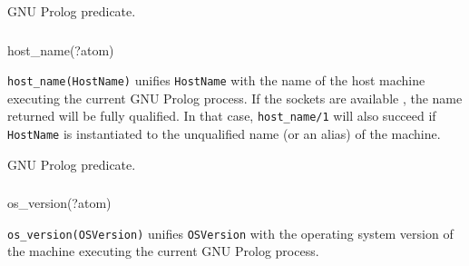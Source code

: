 \Portability

GNU Prolog predicate.

\subsubsection{}

\begin{TemplatesOneCol}
host\_name(?atom)

\end{TemplatesOneCol}

\Description

\texttt{host\_name(HostName)} unifies \texttt{HostName} with the name of the
host machine executing the current GNU Prolog process. If the sockets are
available , the name returned
will be fully qualified. In that case, \texttt{host\_name/1} will also
succeed if \texttt{HostName} is instantiated to the unqualified name (or an
alias) of the machine.

\begin{PlErrors}



\end{PlErrors}

\Portability

GNU Prolog predicate.

\subsubsection{}

\begin{TemplatesOneCol}
os\_version(?atom)

\end{TemplatesOneCol}

\Description

\texttt{os\_version(OSVersion)} unifies \texttt{OSVersion} with the
operating system version of the machine executing the current GNU Prolog
process.

\begin{PlErrors}



\end{PlErrors}

